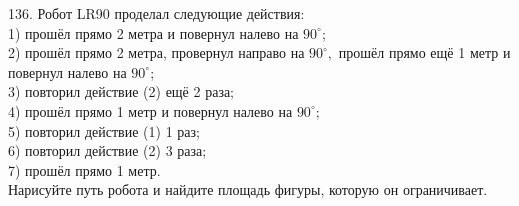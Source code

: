 136. Робот LR90 проделал следующие действия:\\
1) прошёл прямо 2 метра и повернул налево на $90^\circ$;\\
2) прошёл прямо 2 метра, провернул направо на $90^\circ,$ прошёл прямо ещё 1 метр и повернул налево на $90^\circ$;\\
3) повторил действие (2) ещё 2 раза;\\
4) прошёл прямо 1 метр и повернул налево на $90^\circ$;\\
5) повторил действие (1) 1 раз;\\
6) повторил действие (2) 3 раза;\\
7) прошёл прямо 1 метр.\\
Нарисуйте путь робота и найдите площадь фигуры, которую он ограничивает.\\

